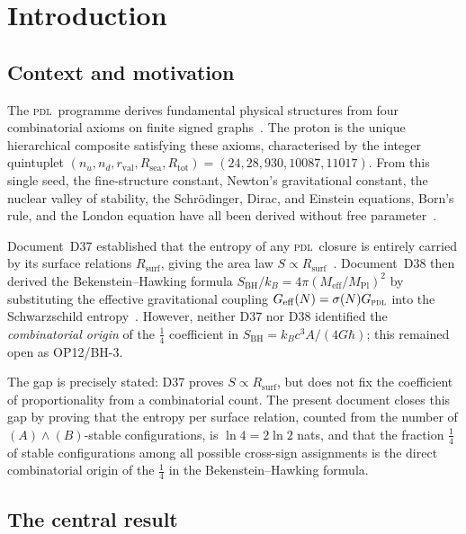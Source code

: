 \documentclass[12pt,a4paper]{article}
\newcommand{\PDL}{\textsc{pdl}}
\newcommand{\Rsurf}{R_{\mathrm{surf}}}
\newcommand{\Rtot}{R_{\mathrm{tot}}}
\newcommand{\rval}{r_{\mathrm{val}}}
\newcommand{\Rsea}{R_{\mathrm{sea}}}
\newcommand{\SBH}{S_{\mathrm{BH}}}
\newcommand{\Meff}{M_{\mathrm{eff}}}
\newcommand{\MPl}{M_{\mathrm{Pl}}}
\newcommand{\sig}{\sigma}
\begin{document}
\tableofcontents
\newpage

\section{Introduction}
\label{sec:intro}

\subsection{Context and motivation}

The \PDL\ programme derives fundamental physical structures from four combinatorial axioms on finite signed graphs~\cite{PDL_D01_2026}. The proton is the unique hierarchical composite satisfying these axioms, characterised by the integer quintuplet $(n_u, n_d, \rval, \Rsea, \Rtot) = (24, 28, 930, 10087, 11017)$. From this single seed, the fine-structure constant, Newton's gravitational constant, the nuclear valley of stability, the Schrödinger, Dirac, and Einstein equations, Born's rule, and the London equation have all been derived without free parameter~\cite{PDL_D12_2026,PDL_D21_2026,PDL_D42_2026,PDL_D49_2026}.

Document~D37 established that the entropy of any \PDL\ closure is entirely carried by its surface relations $\Rsurf$, giving the area law $S \propto \Rsurf$~\cite{PDL_D37_2026}. Document~D38 then derived the Bekenstein--Hawking formula $\SBH/k_B = 4\pi(\Meff/\MPl)^2$ by substituting the effective gravitational coupling $G_{\mathrm{eff}}(N) = \sig(N)G_{\PDL}$ into the Schwarzschild entropy~\cite{PDL_D38_2026}. However, neither D37 nor D38 identified the \emph{combinatorial origin} of the $\tfrac{1}{4}$ coefficient in $\SBH = k_B c^3 A/(4G\hbar)$; this remained open as OP12/BH-3.

The gap is precisely stated: D37 proves $S \propto \Rsurf$, but does not fix the coefficient of proportionality from a combinatorial count. The present document closes this gap by proving that the entropy per surface relation, counted from the number of $(A)\wedge(B)$-stable configurations, is $\ln 4 = 2\ln 2$ nats, and that the fraction $\tfrac{1}{4}$ of stable configurations among all possible cross-sign assignments is the direct combinatorial origin of the $\tfrac{1}{4}$ in the Bekenstein--Hawking formula.

\subsection{The central result}
\end{document}
